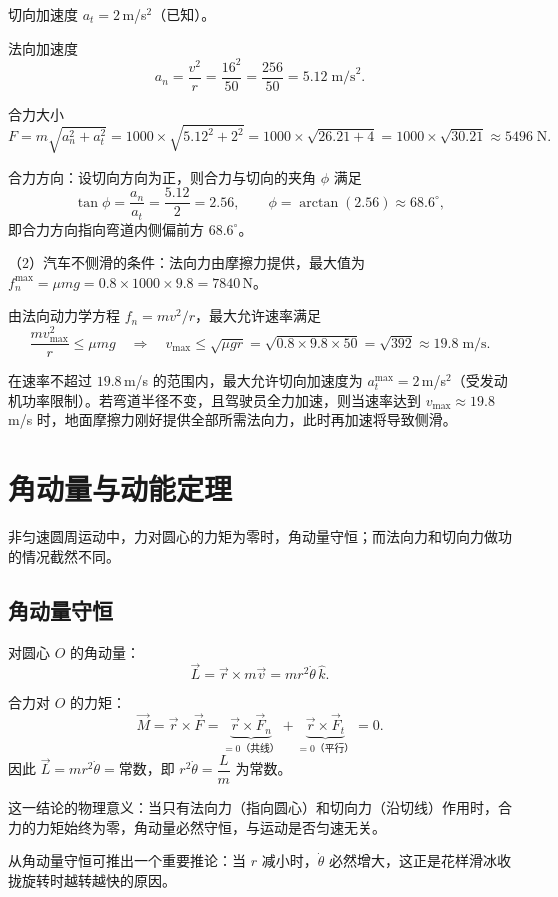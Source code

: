 \documentclass[12pt,a4paper]{article}
\begin{document}
切向加速度 $a_t = 2\,$m/s$^2$（已知）。

法向加速度
\[
a_n = \frac{v^2}{r} = \frac{16^2}{50} = \frac{256}{50} = 5.12\;\text{m/s}^2.
\]

合力大小
\[
F = m\sqrt{a_n^2 + a_t^2}
   = 1000\times\sqrt{5.12^2 + 2^2}
   = 1000\times\sqrt{26.21 + 4}
   = 1000\times\sqrt{30.21}
   \approx 5496\;\text{N}.
\]

合力方向：设切向方向为正，则合力与切向的夹角 $\phi$ 满足
\[
\tan\phi = \frac{a_n}{a_t} = \frac{5.12}{2} = 2.56,
\qquad \phi = \arctan(2.56) \approx 68.6^\circ,
\]
即合力方向指向弯道内侧偏前方 $68.6^\circ$。

（2）汽车不侧滑的条件：法向力由摩擦力提供，最大值为 $f_n^{\max} = \mu mg = 0.8\times 1000\times 9.8 = 7840\,$N。

由法向动力学方程 $f_n = m v^2/r$，最大允许速率满足
\[
\frac{mv_{\max}^2}{r} \leq \mu mg
\quad\Longrightarrow\quad
v_{\max} \leq \sqrt{\mu g r} = \sqrt{0.8\times 9.8\times 50}
          = \sqrt{392} \approx 19.8\;\text{m/s}.
\]

在速率不超过 $19.8\,$m/s 的范围内，最大允许切向加速度为 $a_t^{\max} = 2\,$m/s$^2$（受发动机功率限制）。若弯道半径不变，且驾驶员全力加速，则当速率达到 $v_{\max}\approx 19.8\,$m/s 时，地面摩擦力刚好提供全部所需法向力，此时再加速将导致侧滑。

\section{角动量与动能定理}

非匀速圆周运动中，力对圆心的力矩为零时，角动量守恒；而法向力和切向力做功的情况截然不同。

\subsection{角动量守恒}

对圆心 $O$ 的角动量：
\[
\vec{L} = \vec{r}\times m\vec{v} = mr^2\dot{\theta}\,\hat{k}.
\]

合力对 $O$ 的力矩：
\[
\vec{M} = \vec{r}\times\vec{F}
        = \underbrace{\vec{r}\times\vec{F}_n}_{=0\text{（共线）}}
          + \underbrace{\vec{r}\times\vec{F}_t}_{=0\text{（平行）}}
        = 0.
\]
因此 $\vec{L} = mr^2\dot{\theta} = \text{常数}$，即 $r^2\dot{\theta} = \dfrac{L}{m}$ 为常数。

这一结论的物理意义：当只有法向力（指向圆心）和切向力（沿切线）作用时，合力的力矩始终为零，角动量必然守恒，与运动是否匀速无关。

从角动量守恒可推出一个重要推论：当 $r$ 减小时，$\dot{\theta}$ 必然增大，这正是花样滑冰收拢旋转时越转越快的原因。
\end{document}
